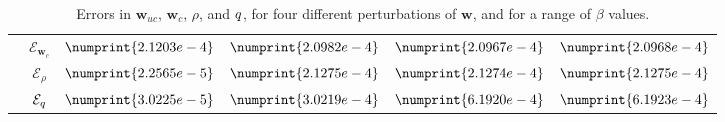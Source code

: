 \begin{table}
\begin{tabular}{ | c | c || c | c | c | c ||}
 & $\mathcal{E}_{\mathbf{w}_c}$ & $\numprint{2.1203e-4}$ & $\numprint{2.0982e-4}$ & $\numprint{2.0967e-4}$ & $\numprint{2.0968e-4}$ \\
 & $\mathcal{E}_{\rho}$ & $\numprint{2.2565e-5}$ & $\numprint{2.1275e-4}$ & $\numprint{2.1274e-4}$ & $\numprint{2.1275e-4}$ \\
 & $\mathcal{E}_{q}$ & $\numprint{3.0225e-5}$ & $\numprint{3.0219e-4}$ & $\numprint{6.1920e-4}$ & $\numprint{6.1923e-4}$ \\
\hline
\end{tabular}
\caption{Errors in $\mathbf{w}_{uc}$, $\mathbf{w}_{c}$, $\rho$, and $q$, for four different perturbations of  $\mathbf{w}$, and for a range of $\beta$ values.}
\label{TabA2:Prob1}
\end{table}